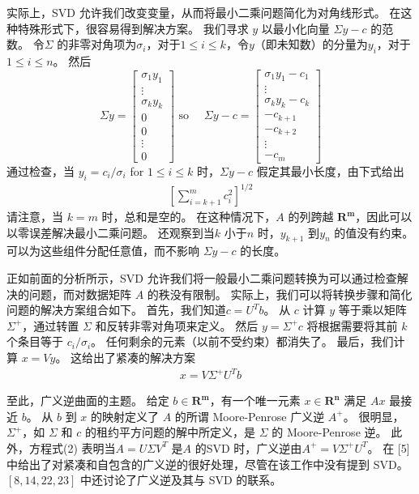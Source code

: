 \documentclass[11pt,a4paper,twoside]{article}
\begin{document}
\begin{CJK}{UTF8}{gbsn}
实际上，SVD 允许我们改变变量，从而将最小二乘问题简化为对角线形式。 在这种特殊形式下，很容易得到解决方案。 我们寻求 $y$ 以最小化向量 $\Sigma y-c$ 的范数。 令$\Sigma$ 的非零对角项为$\sigma_{i}$，对于$1 \leq i \leq k$，令$y$（即未知数）的分量为$y_{i}$，对于 $1 \leq i \leq n$。 然后
$$
\Sigma y=\left[\begin{array}{c}
\sigma_{1} y_{1} \\
\vdots \\
\sigma_{k} y_{k} \\
0 \\
0 \\
\vdots \\
0
\end{array}\right] \text { so } \quad \Sigma y-c=\left[\begin{array}{c}
\sigma_{1} y_{1}-c_{1} \\
\vdots \\
\sigma_{k} y_{k}-c_{k} \\
-c_{k+1} \\
-c_{k+2} \\
\vdots \\
-c_{m}
\end{array}\right]
$$
通过检查，当 $y_{i}=c_{i} / \sigma_{i}$ for $1 \leq i \leq k$ 时，$\Sigma y-c$ 假定其最小长度，由下式给出
\begin{align}
\left[\sum_{i=k+1}^{m} c_{i}^{2}\right]^{1 / 2}
\end{align}
请注意，当 $k=m$ 时，总和是空的。 在这种情况下，$A$ 的列跨越 $\mathbf{R}^{\mathbf{m}}$，因此可以以零误差解决最小二乘问题。 还观察到当$k$ 小于$n$ 时，$y_{k+1}$ 到$y_{n}$ 的值没有约束。 可以为这些组件分配任意值，而不影响 $\Sigma y-c$ 的长度。

正如前面的分析所示，SVD 允许我们将一般最小二乘问题转换为可以通过检查解决的问题，而对数据矩阵 $A$ 的秩没有限制。 实际上，我们可以将转换步骤和简化问题的解决方案组合如下。 首先，我们知道$c=U^{T} b$。 从 $c$ 计算 $y$ 等于乘以矩阵 $\Sigma^{+}$，通过转置 $\Sigma$ 和反转非零对角项来定义。 然后 $y=\Sigma^{+} c$ 将根据需要将其前 $k$ 个条目等于 $c_{i} / \sigma_{i}$。 任何剩余的元素（以前不受约束）都消失了。 最后，我们计算 $x=V y$。 这给出了紧凑的解决方案
\begin{align}
x=V \Sigma^{+} U^{T} b
\end{align}

至此，广义逆曲面的主题。 给定 $b \in \mathbf{R}^{\mathbf{m}}$，有一个唯一元素 $x \in \mathbf{R}^{\mathbf{n}}$ 满足 $A x$ 最接近 $b$。 从 $b$ 到 $x$ 的映射定义了 $A$ 的所谓 Moore-Penrose 广义逆 $A^{+}$。 很明显，$\Sigma^{+}$，如 $\Sigma$ 和 $c$ 的租约平方问题的解中所定义，是 $\Sigma$ 的 Moore-Penrose 逆。 此外，方程式(2) 表明当$A=U \Sigma V^{T}$ 是$A$ 的SVD 时，广义逆由$A^{+}=V \Sigma^{+} U^{T }$。 在 [5] 中给出了对紧凑和自包含的广义逆的很好处理，尽管在该工作中没有提到 SVD。 $[8,14,22,23]$ 中还讨论了广义逆及其与 SVD 的联系。


\end{CJK}
\end{document}
